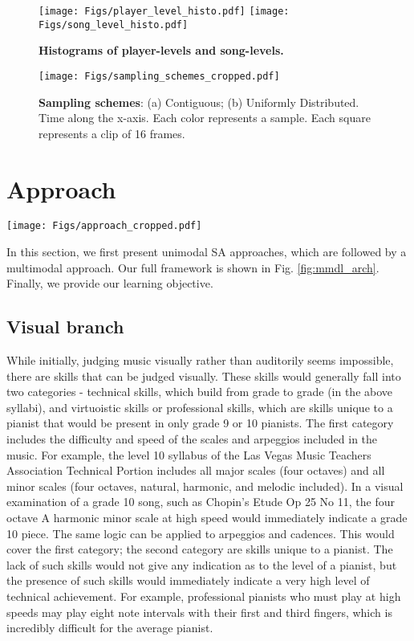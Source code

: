 \documentclass{article}
\begin{document}
\begin{figure}
    \centering
    \texttt{[image: Figs/player\_level\_histo.pdf]}
    \texttt{[image: Figs/song\_level\_histo.pdf]}
    \caption{\textbf{Histograms of player-levels and song-levels.}}
    \label{fig:histograms}
\end{figure}

\begin{figure}
    \centering
    \texttt{[image: Figs/sampling\_schemes\_cropped.pdf]}
    \caption{\textbf{Sampling schemes}: (a) Contiguous; (b) Uniformly Distributed. Time along the x-axis. Each color represents a sample. Each square represents a clip of 16 frames.}
    \label{fig:sampling_schemes}
\end{figure} \section{Approach}
\label{sec:approach}
\begin{figure*}
\centering
\texttt{[image: Figs/approach\_cropped.pdf]} 
\caption{\textbf{Our multimodal learning architecture.}  represents concatenation operation.}
\label{fig:mmdl_arch}
\end{figure*}
In this section, we first present unimodal SA approaches, which are followed by a multimodal approach. Our full framework is shown in Fig. \ref{fig:mmdl_arch}. Finally, we provide our learning objective.

\subsection{Visual branch}
While initially, judging music visually rather than auditorily seems impossible, there are skills that can be judged visually. These skills would generally fall into two categories - technical skills, which build from grade to grade (in the above syllabi), and virtuoistic skills or professional skills, which are skills unique to a pianist that would be present in only grade 9 or 10 pianists. The first category includes the difficulty and speed of the scales and arpeggios included in the music. For example, the level 10 syllabus of the Las Vegas Music Teachers Association Technical Portion \cite{jaiden_5} includes all major scales (four octaves) and all minor scales (four octaves, natural,  harmonic, and melodic included). In a visual examination of a grade 10 song, such as Chopin’s Etude Op 25 No 11, the four octave A harmonic minor scale at high speed would immediately indicate a grade 10 piece. The same logic can be applied to arpeggios and cadences. This would cover the first category; the second category are skills unique to a pianist. The lack of such skills would not give any indication as to the level of a pianist, but the presence of such skills would immediately indicate a very high level of technical achievement. For example, professional pianists who must play at high speeds may play eight note intervals with their first and third fingers, which is incredibly difficult for the average pianist.
\end{document}
